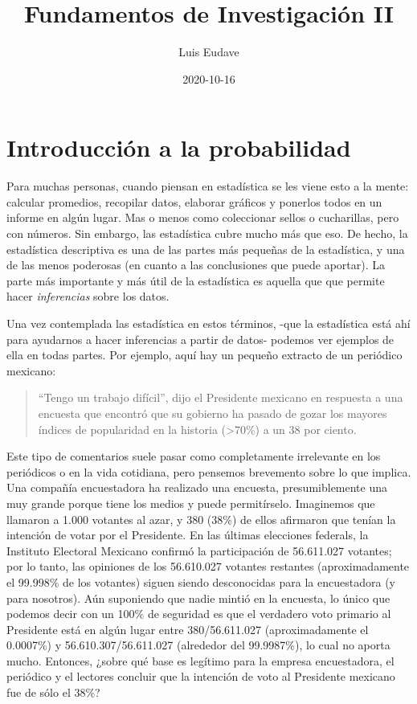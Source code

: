 \documentclass[spanish,]{book}
\title{Fundamentos de Investigación II}
\author{Luis Eudave}
\date{2020-10-16}
\begin{document}
\maketitle

{
\setcounter{tocdepth}{1}
\tableofcontents
}
\chapter{Introducción a la probabilidad}\label{probability}

Para muchas personas, cuando piensan en estadística se les viene esto a
la mente: calcular promedios, recopilar datos, elaborar gráficos y
ponerlos todos en un informe en algún lugar. Mas o menos como
coleccionar sellos o cucharillas, pero con números. Sin embargo, las
estadística cubre mucho más que eso. De hecho, la estadística
descriptiva es una de las partes más pequeñas de la estadística, y una
de las menos poderosas (en cuanto a las conclusiones que puede aportar).
La parte más importante y más útil de la estadística es aquella que que
permite hacer \emph{inferencias} sobre los datos.

Una vez contemplada las estadística en estos términos, -que la
estadística está ahí para ayudarnos a hacer inferencias a partir de
datos- podemos ver ejemplos de ella en todas partes. Por ejemplo, aquí
hay un pequeño extracto de un periódico mexicano:

\begin{quote}
``Tengo un trabajo difícil'', dijo el Presidente mexicano en respuesta a
una encuesta que encontró que su gobierno ha pasado de gozar los mayores
índices de popularidad en la historia (\textgreater{}70\%) a un 38 por
ciento.
\end{quote}

Este tipo de comentarios suele pasar como completamente irrelevante en
los periódicos o en la vida cotidiana, pero pensemos brevemento sobre lo
que implica. Una compañía encuestadora ha realizado una encuesta,
presumiblemente una muy grande porque tiene los medios y puede
permitírselo. Imaginemos que llamaron a 1.000 votantes al azar, y 380
(38\%) de ellos afirmaron que tenían la intención de votar por el
Presidente. En las últimas elecciones federals, la Instituto Electoral
Mexicano confirmó la participación de 56.611.027 votantes; por lo tanto,
las opiniones de los 56.610.027 votantes restantes (aproximadamente el
99.998\% de los votantes) siguen siendo desconocidas para la
encuestadora (y para nosotros). Aún suponiendo que nadie mintió en la
encuesta, lo único que podemos decir con un 100\% de seguridad es que el
verdadero voto primario al Presidente está en algún lugar entre
380/56.611.027 (aproximadamente el 0.0007\%) y 56.610.307/56.611.027
(alrededor del 99.9987\%), lo cual no aporta mucho. Entonces, ¿sobre qué
base es legítimo para la empresa encuestadora, el periódico y el
lectores concluir que la intención de voto al Presidente mexicano fue de
sólo el 38\%?
\end{document}
